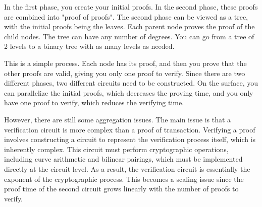   In the first phase, you create your initial proofs.
  In the second phase, these proofs are combined into "proof of proofs". 
  The second phase can be viewed as a tree, with the initial proofs being the leaves. Each parent node proves the proof of the child nodes.
  The tree can have any number of degrees. You can go from a tree of 2 levels to a binary tree with as many levels as needed.
 
 This is a simple process. Each node has its proof, and then you prove that the other proofs are valid, giving you only one proof
 to verify. Since there are two different phases, two different circuits need to be constructed.
 On the surface, you can parallelize the initial proofs, which decreases the proving time, and you only have one proof to verify, which reduces the verifying time.
 
 However, there are still some aggregation issues.
 The main issue is that a verification circuit is more complex than a proof of transaction.
 Verifying a proof involves constructing a circuit to represent the verification process itself, which is inherently complex. 
 This circuit must perform cryptographic operations, including curve arithmetic and bilinear pairings, which must be implemented directly at the circuit level. 
 As a result, the verification circuit is essentially the exponent of the cryptographic process.
 This becomes a scaling issue since the proof time of the second circuit grows linearly with the number of proofs to verify. \cite{Nova23}

